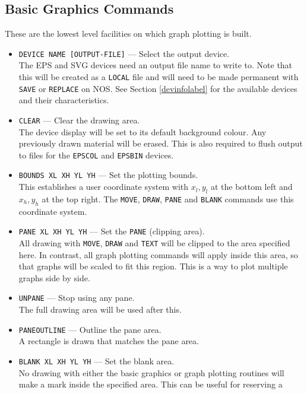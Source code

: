 \documentclass[a4paper,twoside,11pt]{article}
\newcommand{\textttc}[1]{\texttt{\textcolor{OurRed}{#1}}}
\begin{document}
\subsection{Basic Graphics Commands}
These are the lowest level facilities on which graph plotting is built.
\begin{itemize}
\item \textttc{DEVICE NAME [OUTPUT-FILE]} --- Select the output device.\\
   The EPS and SVG devices need an output file name to write to. Note that this
   will be created as a \texttt{LOCAL} file and will need to be made permanent with
   \texttt{SAVE} or \texttt{REPLACE} on NOS. See Section \ref{devinfolabel} for the available devices and their
   characteristics.
\item \textttc{CLEAR} --- Clear the drawing area.\\
   The device display will be set to its default background colour.
   Any previously drawn material will be erased. This is also required to flush output to files
   for the \texttt{EPSCOL} and \texttt{EPSBIN} devices.
\item \textttc{BOUNDS XL XH YL YH} --- Set the plotting bounds.\\
   This establishes a user coordinate system with $x_l,y_l$ at the bottom left
   and $x_h,y_h$ at the top right. The \texttt{MOVE}, \texttt{DRAW}, 
   \texttt{PANE} and \texttt{BLANK} commands use this
   coordinate system.
\item \textttc{PANE XL XH YL YH} --- Set the \texttt{PANE} (clipping area).\\
   All drawing with \texttt{MOVE}, \texttt{DRAW} and \texttt{TEXT} will be clipped to the area specified
   here. In contrast, all graph plotting commands will apply inside this area,
   so that graphs will be scaled to fit this region. This is a way to plot
   multiple graphs side by side.
\item \textttc{UNPANE} --- Stop using any pane.\\ 
   The full drawing area will be used after this.
\item \textttc{PANEOUTLINE} --- Outline the pane area.\\
   A rectangle is drawn that matches the pane area.
\item \textttc{BLANK XL XH YL YH} --- Set the blank area.\\
   No drawing with either the basic graphics or graph plotting routines will
   make a mark inside the specified area. This can be useful for reserving a

\end{itemize}
\end{document}
